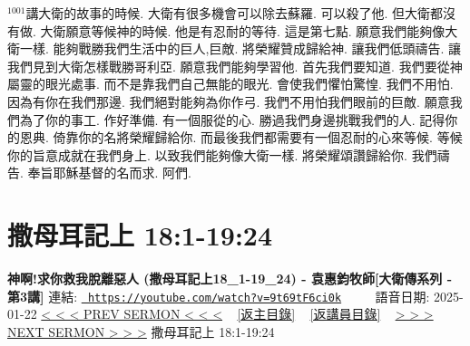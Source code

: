 \documentclass{book}
\begin{document}
$^{1001}$講大衛的故事的時候.
大衛有很多機會可以除去蘇羅.
可以殺了他.
但大衛都沒有做.
大衛願意等候神的時候.
他是有忍耐的等待.
這是第七點.
願意我們能夠像大衛一樣.
能夠戰勝我們生活中的巨人,巨敵.
將榮耀贊成歸給神.
讓我們低頭禱告.
讓我們見到大衛怎樣戰勝哥利亞.
願意我們能夠學習他.
首先我們要知道.
我們要從神屬靈的眼光處事.
而不是靠我們自己無能的眼光.
會使我們懼怕驚惶.
我們不用怕.
因為有你在我們那邊.
我們絕對能夠為你作弓.
我們不用怕我們眼前的巨敵.
願意我們為了你的事工.
作好準備.
有一個服從的心.
勝過我們身邊挑戰我們的人.
記得你的恩典.
倚靠你的名將榮耀歸給你.
而最後我們都需要有一個忍耐的心來等候.
等候你的旨意成就在我們身上.
以致我們能夠像大衛一樣.
將榮耀頌讚歸給你.
我們禱告.
奉旨耶穌基督的名而求.
阿們.
\newpage



\section{撒母耳記上 18:1-19:24}
\label{sec:9t69tF6ci0k}
\textbf{神啊!求你救我脫離惡人 (撒母耳記上18\_1-19\_24) - 袁惠鈞牧師[大衛傳系列 - 第3講]}
\newline
\newline
連結: \href{https://youtube.com/watch?v=9t69tF6ci0k}{\texttt{ https://youtube.com/watch?v=9t69tF6ci0k}} ~~~~ 語音日期: 2025-01-22 
\newline
\newline
\hyperref[sec:OtTM_EdQEtA]{< < < PREV SERMON < < <}
~
\hyperlink{toc}{[返主目錄]}
~
\hyperref[ch:preacher6]{[返講員目錄]}
~
\hyperref[sec:rN0dS2BBBmc]{> > > NEXT SERMON > > >}
\newline
\newline
撒母耳記上 18:1-19:24
\newline
\end{document}
